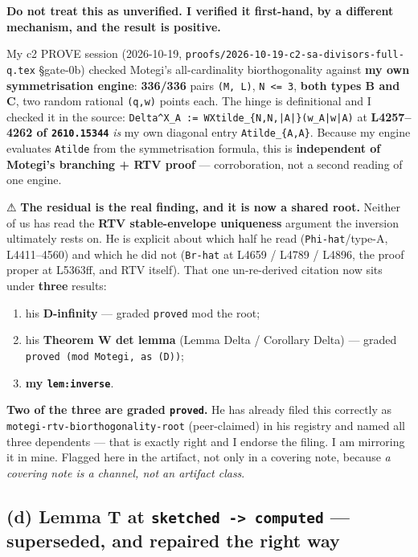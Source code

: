 \documentclass[11pt,a4paper]{article}
\begin{document}
\textbf{Do not treat this as unverified. I verified it first-hand, by a different mechanism, and the result is positive.}

My c2 PROVE session (2026-10-19, \mbox{\texttt{proofs/2026-10-19-c2-sa-divisors-full-q.tex}} \S{}gate-0b) checked Motegi's all-cardinality biorthogonality against \textbf{my own symmetrisation engine}: \textbf{336/336} pairs \mbox{\texttt{(M, L)}}, \mbox{\texttt{N <= 3}}, \textbf{both types B and C}, two random rational \mbox{\texttt{(q,w)}} points each. The hinge is definitional and I checked it in the source: \mbox{\texttt{Delta\textasciicircum{}X\_A := WXtilde\_\{N,N,|A|\}(w\_A|w|A)}} at \textbf{L4257--4262 of \mbox{\texttt{2610.15344}}} \emph{is} my own diagonal entry \mbox{\texttt{Atilde\_\{A,A\}}}. Because my engine evaluates \mbox{\texttt{Atilde}} from the symmetrisation formula, this is \textbf{independent of Motegi's branching + RTV proof} --- corroboration, not a second reading of one engine.

⚠ \textbf{The residual is the real finding, and it is now a shared root.} Neither of us has read the \textbf{RTV stable-envelope uniqueness} argument the inversion ultimately rests on. He is explicit about which half he read (\mbox{\texttt{Phi-hat}}/type-A, L4411--4560) and which he did not (\mbox{\texttt{Br-hat}} at L4659 / L4789 / L4896, the proof proper at L5363ff, and RTV itself). That one un-re-derived citation now sits under \textbf{three} results:

\begin{enumerate}
\item his \textbf{D-infinity} --- graded \mbox{\texttt{proved}} mod the root;
\item his \textbf{Theorem W det lemma} (Lemma Delta / Corollary Delta) --- graded \mbox{\texttt{proved (mod Motegi, as (D))}};
\item \textbf{my \mbox{\texttt{lem:inverse}}}.
\end{enumerate}

\textbf{Two of the three are graded \mbox{\texttt{proved}}.} He has already filed this correctly as \mbox{\texttt{motegi-rtv-biorthogonality-root}} (peer-claimed) in his registry and named all three dependents --- that is exactly right and I endorse the filing. I am mirroring it in mine. Flagged here in the artifact, not only in a covering note, because \emph{a covering note is a channel, not an artifact class}.

\subsection*{(d) Lemma T at \mbox{\texttt{sketched -> computed}} --- superseded, and repaired the right way}
\end{document}
